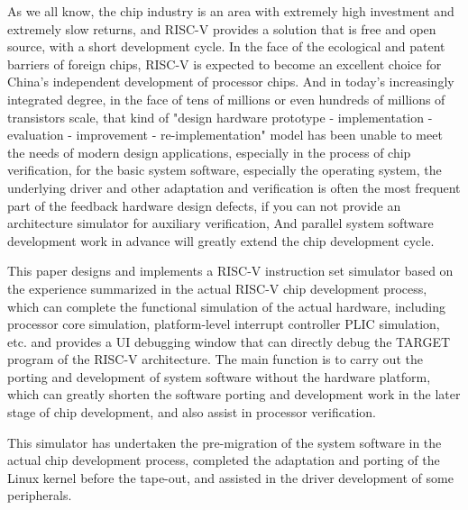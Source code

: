 \begin{abstract*}
  As we all know, the chip industry is an area with extremely high investment and extremely slow returns, and RISC-V provides a solution that is free and open source, with a short development cycle. In the face of the ecological and patent barriers of foreign chips, RISC-V is expected to become an excellent choice for China's independent development of processor chips. And in today's increasingly integrated degree, in the face of tens of millions or even hundreds of millions of transistors scale, that kind of "design hardware prototype - implementation - evaluation - improvement - re-implementation" model has been unable to meet the needs of modern design applications, especially in the process of chip verification, for the basic system software, especially the operating system, the underlying driver and other adaptation and verification is often the most frequent part of the feedback hardware design defects, if you can not provide an architecture simulator for auxiliary verification, And parallel system software development work in advance will greatly extend the chip development cycle.


  This paper designs and implements a RISC-V instruction set simulator based on the experience summarized in the actual RISC-V chip development process, which can complete the functional simulation of the actual hardware, including processor core simulation, platform-level interrupt controller PLIC simulation, etc. and provides a UI debugging window that can directly debug the TARGET program of the RISC-V architecture. The main function is to carry out the porting and development of system software without the hardware platform, which can greatly shorten the software porting and development work in the later stage of chip development, and also assist in processor verification.

  
This simulator has undertaken the pre-migration of the system software in the actual chip development process, completed the adaptation and porting of the Linux kernel before the tape-out, and assisted in the driver development of some peripherals.
\end{abstract*}
